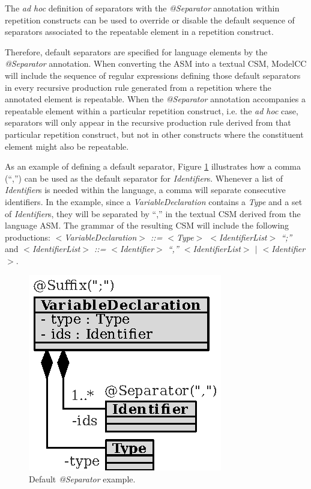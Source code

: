 \documentclass[a4paper,twoside,onecolumn]{article}
\newcommand{\etexttt}[1]{\textit{#1}}
\newcommand{\an}[1]{\emph{#1}} %
\begin{document}
The \emph{ad hoc} definition of separators with the \an{@Separator} annotation within repetition constructs can be used to override or disable the default sequence of separators associated to the repeatable element in a repetition construct.

Therefore, default separators are specified for language elements by the \an{@Separator} annotation.
When converting the ASM into a textual CSM, ModelCC will include the sequence of regular expressions defining those default separators in every recursive production rule generated from a repetition where the annotated element is repeatable.
When the \an{@Separator} annotation accompanies a repeatable element within a particular repetition construct, i.e. the \emph{ad hoc} case, separators will only appear in the recursive production rule derived from that particular repetition construct, but not in other constructs where the constituent element might also be repeatable.

As an example of defining a default separator, Figure \ref{fig:identifier2} illustrates how a comma (``,'') can be used as the default separator for \emph{Identifier}s.
Whenever a list of \emph{Identifier}s is needed within the language, a comma will separate consecutive identifiers.
In the example, since a \emph{VariableDeclaration} contains a \emph{Type} and a set of \emph{Identifier}s, they will be separated by ``,'' in the textual CSM derived from the language ASM.
The grammar of the resulting CSM will include the following productions: \etexttt{$<$VariableDeclaration$>$ ::= $<$Type$>$ $<$IdentifierList$>$ ``;''} and \etexttt{$<$IdentifierList$>$ ::= $<$Identifier$>$ ``,'' $<$IdentifierList$>$ $|$ $<$Identifier$>$}.

\begin{figure}[tb!]
\centering
\includegraphics[scale=1]{identifier2.eps}
\caption{Default \an{@Separator} example.} \label{fig:identifier2}
\end{figure}
\end{document}
